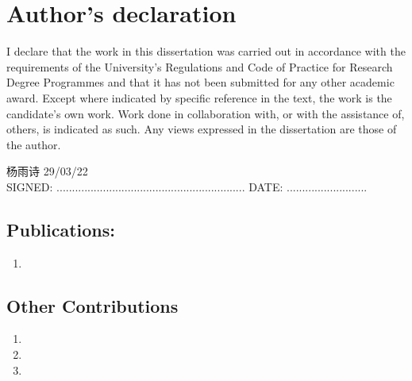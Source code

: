 \documentclass[11pt,twoside]{report}
\begin{document}
\vfill


\cleardoublepage
\chapter*{Author's declaration}

I declare that the work in this dissertation was carried out in accordance with the requirements of the University's Regulations and Code of Practice for Research Degree Programmes and that it has not been submitted for any other academic award.
Except where indicated by specific reference in the text, the work is the candidate's own work.
Work done in collaboration with, or with the assistance of, others, is indicated as such. Any views expressed in the dissertation are those of the author.

\vspace{1cm}
\vspace{-3pt}

\hspace{2.5cm} {{\selectfont \Huge{杨雨诗}}} \hspace{5.5cm} 29/03/22 \vspace{-\baselineskip} \vspace{3pt} \\
SIGNED: .............................................................
\qquad
DATE: ..........................

\vspace{1cm}

\section*{Publications:}

\begin{enumerate}
	\item {}
\end{enumerate}

\section*{Other Contributions}

\begin{enumerate}
	\item {}
	\item {}
	\item {}
\end{enumerate}
\end{document}
